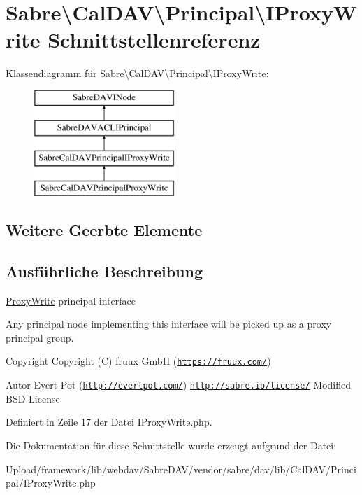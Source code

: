 \hypertarget{interface_sabre_1_1_cal_d_a_v_1_1_principal_1_1_i_proxy_write}{}\section{Sabre\textbackslash{}Cal\+D\+AV\textbackslash{}Principal\textbackslash{}I\+Proxy\+Write Schnittstellenreferenz}
\label{interface_sabre_1_1_cal_d_a_v_1_1_principal_1_1_i_proxy_write}
Klassendiagramm für Sabre\textbackslash{}Cal\+D\+AV\textbackslash{}Principal\textbackslash{}I\+Proxy\+Write\+:\begin{figure}[H]
\begin{center}
\leavevmode
\includegraphics[height=4.000000cm]{interface_sabre_1_1_cal_d_a_v_1_1_principal_1_1_i_proxy_write}
\end{center}
\end{figure}
\subsection*{Weitere Geerbte Elemente}


\subsection{Ausführliche Beschreibung}
\mbox{\hyperlink{class_sabre_1_1_cal_d_a_v_1_1_principal_1_1_proxy_write}{Proxy\+Write}} principal interface

Any principal node implementing this interface will be picked up as a \textquotesingle{}proxy principal group\textquotesingle{}.

\begin{DoxyCopyright}{Copyright}
Copyright (C) fruux GmbH (\href{https://fruux.com/}{\tt https\+://fruux.\+com/}) 
\end{DoxyCopyright}
\begin{DoxyAuthor}{Autor}
Evert Pot (\href{http://evertpot.com/}{\tt http\+://evertpot.\+com/})  \href{http://sabre.io/license/}{\tt http\+://sabre.\+io/license/} Modified B\+SD License 
\end{DoxyAuthor}


Definiert in Zeile 17 der Datei I\+Proxy\+Write.\+php.



Die Dokumentation für diese Schnittstelle wurde erzeugt aufgrund der Datei\+:\begin{DoxyCompactItemize}
\item 
Upload/framework/lib/webdav/\+Sabre\+D\+A\+V/vendor/sabre/dav/lib/\+Cal\+D\+A\+V/\+Principal/I\+Proxy\+Write.\+php\end{DoxyCompactItemize}
